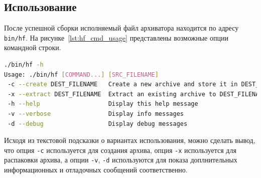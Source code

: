 



\subsection{Использование}

После успешной сборки исполняемый файл архиватора находится по адресу
\texttt{bin/hf}. На рисунке~\ref{lst:hf_cmd_usage} представлены возможные опции
командной строки.

\begin{lstlisting}[basicstyle=\scriptsize\ttfamily,
                   numberstyle=\scriptsize\ttfamily,
                   xleftmargin=7mm,
                   language=bash,
                   caption=Возможные опции \\
                   командной строки архиватора,
                   label=lst:hf_cmd_usage]
./bin/hf -h 
Usage: ./bin/hf [COMMAND...] [SRC_FILENAME]
 -c --create DEST_FILENAME   Create a new archive and store it in DEST_FILENAME
 -x --extract DEST_FILENAME  Extract an existing archive to DEST_FILENAME
 -h --help                   Display this help message
 -v --verbose                Display info messages
 -d --debug                  Display debug messages
\end{lstlisting}

Исходя из текстовой подсказки о вариантах использования, можно сделать вывод,
что опция \texttt{-c} используется для создания архива,
опция \texttt{-x} используется для распаковки архива,
а опции \texttt{-v}, \texttt{-d} используются для показа доплнительных
информационных и отладочных сообщений соответственно.

